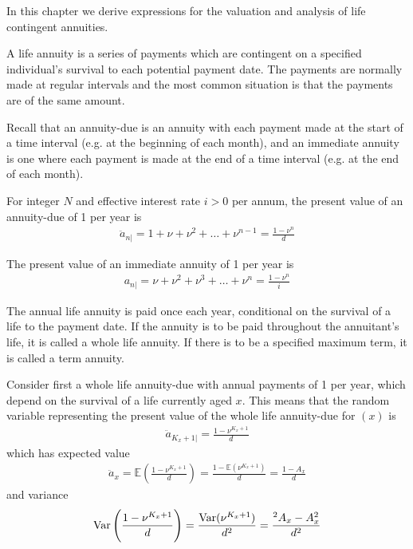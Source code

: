 \documentclass[hidelinks, 12pt]{article}
\DeclareMathOperator{\Var}{Var}
\theoremstyle{mydefstyle}
\theoremstyle{mythmstyle}
\begin{document}
In this chapter we derive expressions for the valuation and analysis of life contingent annuities.

A life annuity is a series of payments which are contingent on a specified individual's survival to each potential payment date. The payments are normally made at regular intervals and the most common situation is that the payments are of the same amount. 

Recall that an annuity-due is an annuity with each payment made at the start of a time interval (e.g. at the beginning of each month), and an immediate annuity is one where each payment is made at the end of a time interval (e.g. at the end of each month). 

For integer $N$ and effective interest rate $i > 0$ per annum, the present value of an annuity-due of 1 per year is
\begin{gather*}
\ddot{a}_{n|} = 1 + \nu + \nu^2 + \dots + \nu^{n-1} = \frac{1 - \nu^n}{d}
\end{gather*}

The present value of an immediate annuity of 1 per year is
\begin{gather*}
a_{n|} = \nu + \nu^2 + \nu^3 + \dots + \nu^n = \frac{1 - \nu^n}{i}
\end{gather*}

The annual life annuity is paid once each year, conditional on the survival of a life to the payment date. If the annuity is to be paid throughout the annuitant's life, it is called a whole life annuity. If there is to be a specified maximum term, it is called a term annuity. 

Consider first a whole life annuity-due with annual payments of 1 per year, which depend on the survival of a life currently aged $x$. This means that the random variable representing the present value of the whole life annuity-due for $(x)$ is
\begin{gather*}
\ddot{a}_{K_x + 1 |} = \frac{1 - \nu^{K_x + 1}}{d}
\end{gather*}
which has expected value
\begin{gather*}
\ddot{a}_x = \mathbb{E}\left( \frac{1 - \nu^{K_x+1}}{d} \right) = \frac{1 - \mathbb{E}(\nu^{K_x+1})}{d} = \frac{1 - A_x}{d}
\end{gather*}
and variance
\begin{gather*}
\Var\left(\frac{1 - \nu^{K_x+1}}{d}\right) = \frac{\Var(\nu^{K_x+1})}{d^2} = \frac{\hspace{0mm}^2A_x - A_x^2}{d^2}
\end{gather*}
\end{document}
